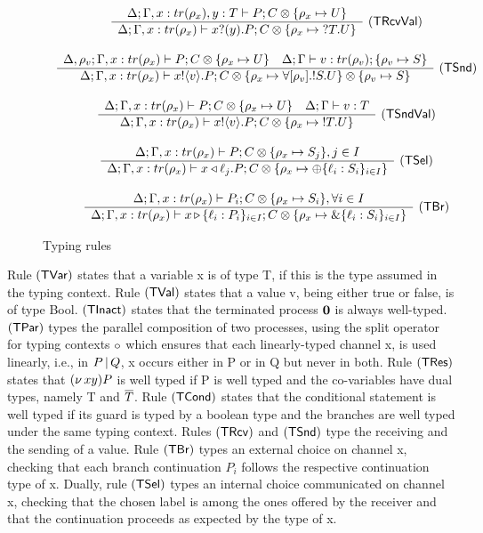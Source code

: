 \begin{figure}[H]
\[\begin{array}{cc}
      \\ \\
      \tree{
      \Delta; \Gamma, x : tr(\rho_x), y: T \types P; C \otimes \{\rho_x \mapsto U\}
        }{
          \Delta; \Gamma, x: tr(\rho_x) \types \pin{x}{y} P; C \otimes \{\rho_x \mapsto \tin T U \}
        }{\TRcvVal}
    \\ \\
    \tree{
    \Delta, \rho_v; \Gamma, x: tr(\rho_x) \types P; C \otimes \{ \rho_x \mapsto U\}
      \andalso
    \Delta; \Gamma \types v : tr(\rho_v); \{\rho_v \mapsto S\}
    }{
    \Delta; \Gamma, x: tr(\rho_x) \types \pout{x}{v} P; C \otimes \{\rho_x \mapsto  \forall [\rho_v].\tout S U\} \otimes \{\rho_v \mapsto S\}
    }{\TSnd}
    \\ \\
    \tree{
    \Delta; \Gamma, x: tr(\rho_x) \types P; C \otimes \{ \rho_x \mapsto U\}
      \andalso
    \Delta; \Gamma \types v : T
    }{
    \Delta; \Gamma, x: tr(\rho_x) \types \pout{x}{v} P; C \otimes \{\rho_x \mapsto  \tout T U\}
      }{\TSndVal}
  \\ \\
    \tree{
    \Delta; \Gamma, x: tr(\rho_x) \types P; C \otimes \{\rho_x \mapsto S_j\}, j \in I
    }{
    \Delta; \Gamma, x : tr(\rho_x) \types \sel{x}{\ell_j} P; C \otimes \{\rho_x \mapsto \tselI{\ell}{S}\}
    }{\TSel}
    \\ \\
    \tree {
    \Delta; \Gamma, x : tr(\rho_x) \types P_i; C \otimes \{\rho_x \mapsto S_i\}, \forall i \in I
    }{
      \Delta; \Gamma, x : tr(\rho_x) \types \branch{x}{\ell_i:P_i}_{i \in I}; C \otimes \{\rho_x \mapsto \tbranchOn{\ell_i:S_i}_{i \in I}\}
    }{\TBr}
  \end{array}
  \]

\caption{Typing rules}\label{typing_rules}
\end{figure}

Rule $\mathsf{{\displaystyle (TVar)}}$ states that a variable x is of type T, if this is the type assumed in the typing context. Rule $\mathsf{{\displaystyle (TVal)}}$ states that a value v, being either true or false, is of type Bool. $\mathsf{{\displaystyle (TInact)}}$ states that the terminated process $\mathbf{0}$ is always well-typed. $\mathsf{{\displaystyle (TPar)}}$ types the parallel composition of two processes, using the split operator for typing contexts $\circ$ which ensures that each linearly-typed channel x, is used linearly, i.e., in $P \,|\, Q$, x occurs either in P or in Q but never in both. Rule $\mathsf{{\displaystyle (TRes)}}$ states that $(\nu\,xy) P$ is well typed if P is well typed and the co-variables have dual types, namely T and $\overline{T}$. Rule $\mathsf{{\displaystyle (TCond)}}$ states that the conditional statement is well typed if its guard is typed by a boolean type and the branches are well typed under the same typing context. Rules $\mathsf{{\displaystyle (TRcv)}}$ and $\mathsf{{\displaystyle (TSnd)}}$ type the receiving and the sending of a value. Rule $\mathsf{{\displaystyle (TBr)}}$ types an external choice on channel x, checking that each branch continuation $P_i$ follows the respective continuation type of x. Dually, rule $\mathsf{{\displaystyle (TSel)}}$ types an internal choice communicated on channel x, checking that the chosen label is among the ones offered by the receiver and that the continuation proceeds as expected by the type of x.

